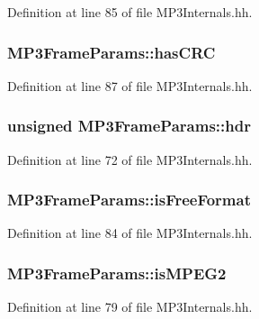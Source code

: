 Definition at line 85 of file M\+P3\+Internals.\+hh.

\subsubsection[{has\+C\+R\+C}]{ M\+P3\+Frame\+Params\+::has\+C\+R\+C}\label{classMP3FrameParams_abf5cc2775aec936beb32cb18d54216b4}


Definition at line 87 of file M\+P3\+Internals.\+hh.

\subsubsection[{hdr}]{\setlength{\rightskip}{0pt plus 5cm}unsigned M\+P3\+Frame\+Params\+::hdr}\label{classMP3FrameParams_a115b347e3fedbdfe92cd84e61325c8d1}


Definition at line 72 of file M\+P3\+Internals.\+hh.

\subsubsection[{is\+Free\+Format}]{ M\+P3\+Frame\+Params\+::is\+Free\+Format}\label{classMP3FrameParams_adc0e85625c433a441b28eebcd4f8b80a}


Definition at line 84 of file M\+P3\+Internals.\+hh.

\subsubsection[{is\+M\+P\+E\+G2}]{ M\+P3\+Frame\+Params\+::is\+M\+P\+E\+G2}\label{classMP3FrameParams_ade7cca167a23890ecf7482110c129bff}


Definition at line 79 of file M\+P3\+Internals.\+hh.

